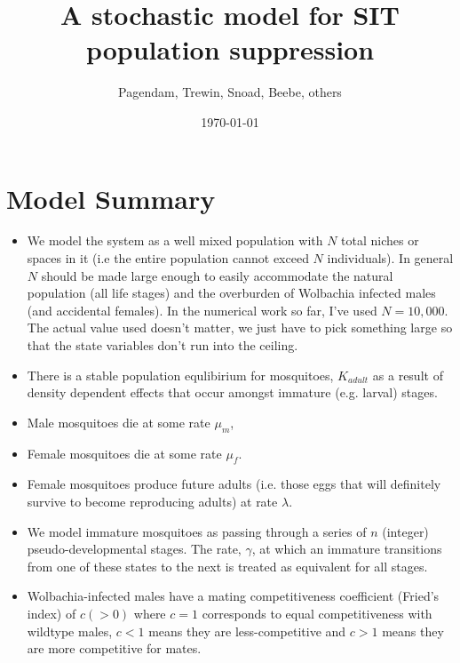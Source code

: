 \documentclass[]{article}  %
\begin{document}
\title{A stochastic model for SIT population suppression}   %
\author{Pagendam, Trewin, Snoad, Beebe, others}
\date{\today}    %
\maketitle

\section{Model Summary}

\begin{itemize}
\item We model the system as a well mixed population with $N$ total niches or spaces in it (i.e the entire population cannot exceed $N$ individuals).  In general $N$ should be made large enough to easily accommodate the natural population (all life stages) and the overburden of Wolbachia infected males (and accidental females).  In the numerical work so far, I've used $N= 10,000$.  The actual value used doesn't matter, we just have to pick something large so that the state variables don't run into the ceiling.
\item There is a stable population equlibirium for mosquitoes, $K_{adult}$ as a result of density dependent effects that occur amongst immature (e.g. larval) stages.
\item Male mosquitoes die at some rate $\mu_m$,
\item Female mosquitoes die at some rate $\mu_f$.
\item Female mosquitoes produce future adults (i.e. those eggs that will definitely survive to become reproducing adults) at rate $\lambda$.
\item We model immature mosquitoes as passing through a series of $n$ (integer) pseudo-developmental stages.  The rate, $\gamma$, at which an immature transitions from one of these states to the next is treated as equivalent for all stages.
\item Wolbachia-infected males have a mating competitiveness coefficient (Fried's index) of $c (> 0)$ where $c=1$ corresponds to equal competitiveness with wildtype males, $c < 1$ means they are less-competitive and $c > 1$ means they are more competitive for mates.
\end{itemize}
\end{document}
